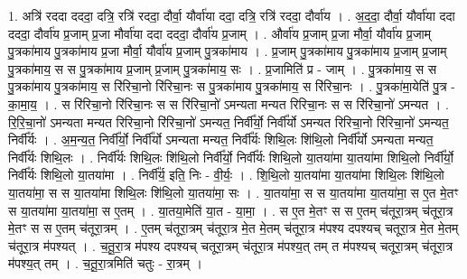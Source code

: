 \documentclass[17pt]{extarticle}
\begin{document}
1. अत्रि॑ रददा दददा॒ दत्रि॒ रत्रि॑ रददा॒ दौर्वा॒ यौर्वा॑या ददा॒ दत्रि॒ रत्रि॑ रददा॒ दौर्वा॑य । . अ॒द॒दा॒ दौर्वा॒ यौर्वा॑या ददा दददा॒ दौर्वा॑य प्र॒जाम् प्र॒जा मौर्वा॑या ददा दददा॒ दौर्वा॑य प्र॒जाम् । . और्वा॑य प्र॒जाम् प्र॒जा मौर्वा॒ यौर्वा॑य प्र॒जाम् पु॒त्रका॑माय पु॒त्रका॑माय प्र॒जा मौर्वा॒ यौर्वा॑य प्र॒जाम् पु॒त्रका॑माय । . प्र॒जाम् पु॒त्रका॑माय पु॒त्रका॑माय प्र॒जाम् प्र॒जाम् पु॒त्रका॑माय॒ स स पु॒त्रका॑माय प्र॒जाम् प्र॒जाम् पु॒त्रका॑माय॒ सः । . प्र॒जामिति॑ प्र - जाम् । . पु॒त्रका॑माय॒ स स पु॒त्रका॑माय पु॒त्रका॑माय॒ स रि॑रिचा॒नो रि॑रिचा॒नः स पु॒त्रका॑माय पु॒त्रका॑माय॒ स रि॑रिचा॒नः । . पु॒त्रका॑मा॒येति॑ पु॒त्र - का॒मा॒य॒ । . स रि॑रिचा॒नो रि॑रिचा॒नः स स रि॑रिचा॒नो॑ ऽमन्यता मन्यत रिरिचा॒नः स स रि॑रिचा॒नो॑ ऽमन्यत । . रि॒रि॒चा॒नो॑ ऽमन्यता मन्यत रिरिचा॒नो रि॑रिचा॒नो॑ ऽमन्यत॒ निर्वी᳚र्यो॒ निर्वी᳚र्यो ऽमन्यत रिरिचा॒नो रि॑रिचा॒नो॑ ऽमन्यत॒ निर्वी᳚र्यः । . अ॒म॒न्य॒त॒ निर्वी᳚र्यो॒ निर्वी᳚र्यो ऽमन्यता मन्यत॒ निर्वी᳚र्यः शिथि॒लः शि॑थि॒लो निर्वी᳚र्यो ऽमन्यता मन्यत॒ निर्वी᳚र्यः शिथि॒लः । . निर्वी᳚र्यः शिथि॒लः शि॑थि॒लो निर्वी᳚र्यो॒ निर्वी᳚र्यः शिथि॒लो या॒तया॑मा या॒तया॑मा शिथि॒लो निर्वी᳚र्यो॒ निर्वी᳚र्यः शिथि॒लो या॒तया॑मा । . निर्वी᳚र्य॒ इति॒ निः - वी॒र्यः॒ । . शि॒थि॒लो या॒तया॑मा या॒तया॑मा शिथि॒लः शि॑थि॒लो या॒तया॑मा॒ स स या॒तया॑मा शिथि॒लः शि॑थि॒लो या॒तया॑मा॒ सः । . या॒तया॑मा॒ स स या॒तया॑मा या॒तया॑मा॒ स ए॒त मे॒तꣳ स या॒तया॑मा या॒तया॑मा॒ स ए॒तम् । . या॒तया॒मेति॑ या॒त - या॒मा॒ । . स ए॒त मे॒तꣳ स स ए॒तम् च॑तूरा॒त्रम् च॑तूरा॒त्र मे॒तꣳ स स ए॒तम् च॑तूरा॒त्रम् । . ए॒तम् च॑तूरा॒त्रम् च॑तूरा॒त्र मे॒त मे॒तम् च॑तूरा॒त्र म॑पश्य दपश्यच् चतूरा॒त्र मे॒त मे॒तम् च॑तूरा॒त्र म॑पश्यत् । . च॒तू॒रा॒त्र म॑पश्य दपश्यच् चतूरा॒त्रम् च॑तूरा॒त्र म॑पश्य॒त् तम् त म॑पश्यच् चतूरा॒त्रम् च॑तूरा॒त्र म॑पश्य॒त् तम् । . च॒तू॒रा॒त्रमिति॑ चतुः - रा॒त्रम् । \newline
\end{document}
